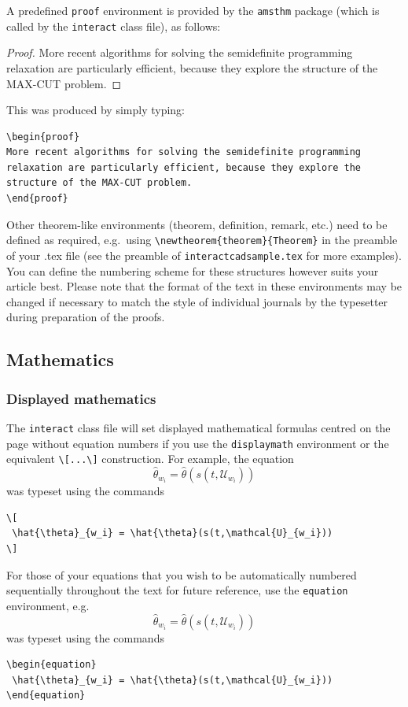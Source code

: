 \documentclass[]{interact}
\theoremstyle{plain}%
\theoremstyle{definition}
\theoremstyle{remark}
\begin{document}
A predefined \verb"proof" environment is provided by the \texttt{amsthm} package (which is called by the \texttt{interact} class file), as follows:
\begin{proof}
More recent algorithms for solving the semidefinite programming relaxation are particularly efficient, because they explore the structure of the MAX-CUT problem.
\end{proof}
\noindent This was produced by simply typing:
\begin{verbatim}
\begin{proof}
More recent algorithms for solving the semidefinite programming
relaxation are particularly efficient, because they explore the
structure of the MAX-CUT problem.
\end{proof}
\end{verbatim}
Other theorem-like environments (theorem, definition, remark, etc.) need to be defined as required, e.g.\ using \verb"\newtheorem{theorem}{Theorem}" in the preamble of your .tex file (see the preamble of \verb"interactcadsample.tex" for more examples). You can define the numbering scheme for these structures however suits your article best. Please note that the format of the text in these environments may be changed if necessary to match the style of individual journals by the typesetter during preparation of the proofs.


\subsection{Mathematics}

\subsubsection{Displayed mathematics}

The \texttt{interact} class file will set displayed mathematical formulas centred on the page without equation numbers if you use the \texttt{displaymath} environment or the equivalent \verb"\[...\]" construction. For example, the equation
\[
 \hat{\theta}_{w_i} = \hat{\theta}(s(t,\mathcal{U}_{w_i}))
\]
was typeset using the commands
\begin{verbatim}
\[
 \hat{\theta}_{w_i} = \hat{\theta}(s(t,\mathcal{U}_{w_i}))
\]
\end{verbatim}

For those of your equations that you wish to be automatically numbered sequentially throughout the text for future reference, use the \texttt{equation} environment, e.g.
\begin{equation}
 \hat{\theta}_{w_i} = \hat{\theta}(s(t,\mathcal{U}_{w_i}))
\end{equation}
was typeset using the commands
\begin{verbatim}
\begin{equation}
 \hat{\theta}_{w_i} = \hat{\theta}(s(t,\mathcal{U}_{w_i}))
\end{equation}
\end{verbatim}
\end{document}
